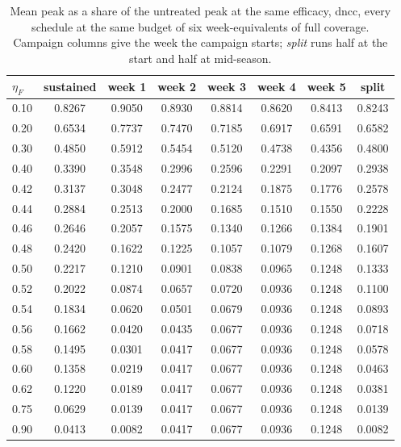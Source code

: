 \begin{table}[htbp]
\centering\small
\caption{Mean peak as a share of the untreated peak at the same efficacy, dncc, every schedule at the same budget of six week-equivalents of full coverage. Campaign columns give the week the campaign starts; \emph{split} runs half at the start and half at mid-season.}
\label{tab:schedules-dncc}
\begin{tabular}{@{}lccccccc@{}}
\toprule
$\eta_{F}$ & sustained & week 1 & week 2 & week 3 & week 4 & week 5 & split \\
\midrule
0.10 & 0.8267 & 0.9050 & 0.8930 & 0.8814 & 0.8620 & 0.8413 & 0.8243 \\
0.20 & 0.6534 & 0.7737 & 0.7470 & 0.7185 & 0.6917 & 0.6591 & 0.6582 \\
0.30 & 0.4850 & 0.5912 & 0.5454 & 0.5120 & 0.4738 & 0.4356 & 0.4800 \\
0.40 & 0.3390 & 0.3548 & 0.2996 & 0.2596 & 0.2291 & 0.2097 & 0.2938 \\
0.42 & 0.3137 & 0.3048 & 0.2477 & 0.2124 & 0.1875 & 0.1776 & 0.2578 \\
0.44 & 0.2884 & 0.2513 & 0.2000 & 0.1685 & 0.1510 & 0.1550 & 0.2228 \\
0.46 & 0.2646 & 0.2057 & 0.1575 & 0.1340 & 0.1266 & 0.1384 & 0.1901 \\
0.48 & 0.2420 & 0.1622 & 0.1225 & 0.1057 & 0.1079 & 0.1268 & 0.1607 \\
0.50 & 0.2217 & 0.1210 & 0.0901 & 0.0838 & 0.0965 & 0.1248 & 0.1333 \\
0.52 & 0.2022 & 0.0874 & 0.0657 & 0.0720 & 0.0936 & 0.1248 & 0.1100 \\
0.54 & 0.1834 & 0.0620 & 0.0501 & 0.0679 & 0.0936 & 0.1248 & 0.0893 \\
0.56 & 0.1662 & 0.0420 & 0.0435 & 0.0677 & 0.0936 & 0.1248 & 0.0718 \\
0.58 & 0.1495 & 0.0301 & 0.0417 & 0.0677 & 0.0936 & 0.1248 & 0.0578 \\
0.60 & 0.1358 & 0.0219 & 0.0417 & 0.0677 & 0.0936 & 0.1248 & 0.0463 \\
0.62 & 0.1220 & 0.0189 & 0.0417 & 0.0677 & 0.0936 & 0.1248 & 0.0381 \\
0.75 & 0.0629 & 0.0139 & 0.0417 & 0.0677 & 0.0936 & 0.1248 & 0.0139 \\
0.90 & 0.0413 & 0.0082 & 0.0417 & 0.0677 & 0.0936 & 0.1248 & 0.0082 \\
\bottomrule
\end{tabular}
\end{table}
